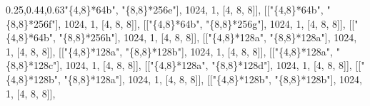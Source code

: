 \documentclass[
  10pt,
  letterpaper,
]{article}
\newenvironment{Shaded}{}{}
\newcommand{\FloatTok}[1]{\textcolor[rgb]{0.25,0.63,0.44}{#1}}
\newcommand{\NormalTok}[1]{#1}
\newcommand{\OperatorTok}[1]{\textcolor[rgb]{0.40,0.40,0.40}{#1}}
\newcommand{\StringTok}[1]{\textcolor[rgb]{0.25,0.44,0.63}{#1}}
\begin{document}
\begin{Shaded}
\begin{Highlighting}[]
\NormalTok{[[}\StringTok{"\{4,8\}*64b"}\OperatorTok{,} \StringTok{"\{8,8\}*256e"}\NormalTok{]}\OperatorTok{,} \FloatTok{1024}\OperatorTok{,} \FloatTok{1}\OperatorTok{,}\NormalTok{ [}\FloatTok{4}\OperatorTok{,} \FloatTok{8}\OperatorTok{,} \FloatTok{8}\NormalTok{]]}\OperatorTok{,}
\NormalTok{[[}\StringTok{"\{4,8\}*64b"}\OperatorTok{,} \StringTok{"\{8,8\}*256f"}\NormalTok{]}\OperatorTok{,} \FloatTok{1024}\OperatorTok{,} \FloatTok{1}\OperatorTok{,}\NormalTok{ [}\FloatTok{4}\OperatorTok{,} \FloatTok{8}\OperatorTok{,} \FloatTok{8}\NormalTok{]]}\OperatorTok{,}
\NormalTok{[[}\StringTok{"\{4,8\}*64b"}\OperatorTok{,} \StringTok{"\{8,8\}*256g"}\NormalTok{]}\OperatorTok{,} \FloatTok{1024}\OperatorTok{,} \FloatTok{1}\OperatorTok{,}\NormalTok{ [}\FloatTok{4}\OperatorTok{,} \FloatTok{8}\OperatorTok{,} \FloatTok{8}\NormalTok{]]}\OperatorTok{,}
\NormalTok{[[}\StringTok{"\{4,8\}*64b"}\OperatorTok{,} \StringTok{"\{8,8\}*256h"}\NormalTok{]}\OperatorTok{,} \FloatTok{1024}\OperatorTok{,} \FloatTok{1}\OperatorTok{,}\NormalTok{ [}\FloatTok{4}\OperatorTok{,} \FloatTok{8}\OperatorTok{,} \FloatTok{8}\NormalTok{]]}\OperatorTok{,}
\NormalTok{[[}\StringTok{"\{4,8\}*128a"}\OperatorTok{,} \StringTok{"\{8,8\}*128a"}\NormalTok{]}\OperatorTok{,} \FloatTok{1024}\OperatorTok{,} \FloatTok{1}\OperatorTok{,}\NormalTok{ [}\FloatTok{4}\OperatorTok{,} \FloatTok{8}\OperatorTok{,} \FloatTok{8}\NormalTok{]]}\OperatorTok{,}
\NormalTok{[[}\StringTok{"\{4,8\}*128a"}\OperatorTok{,} \StringTok{"\{8,8\}*128b"}\NormalTok{]}\OperatorTok{,} \FloatTok{1024}\OperatorTok{,} \FloatTok{1}\OperatorTok{,}\NormalTok{ [}\FloatTok{4}\OperatorTok{,} \FloatTok{8}\OperatorTok{,} \FloatTok{8}\NormalTok{]]}\OperatorTok{,}
\NormalTok{[[}\StringTok{"\{4,8\}*128a"}\OperatorTok{,} \StringTok{"\{8,8\}*128c"}\NormalTok{]}\OperatorTok{,} \FloatTok{1024}\OperatorTok{,} \FloatTok{1}\OperatorTok{,}\NormalTok{ [}\FloatTok{4}\OperatorTok{,} \FloatTok{8}\OperatorTok{,} \FloatTok{8}\NormalTok{]]}\OperatorTok{,}
\NormalTok{[[}\StringTok{"\{4,8\}*128a"}\OperatorTok{,} \StringTok{"\{8,8\}*128d"}\NormalTok{]}\OperatorTok{,} \FloatTok{1024}\OperatorTok{,} \FloatTok{1}\OperatorTok{,}\NormalTok{ [}\FloatTok{4}\OperatorTok{,} \FloatTok{8}\OperatorTok{,} \FloatTok{8}\NormalTok{]]}\OperatorTok{,}
\NormalTok{[[}\StringTok{"\{4,8\}*128b"}\OperatorTok{,} \StringTok{"\{8,8\}*128a"}\NormalTok{]}\OperatorTok{,} \FloatTok{1024}\OperatorTok{,} \FloatTok{1}\OperatorTok{,}\NormalTok{ [}\FloatTok{4}\OperatorTok{,} \FloatTok{8}\OperatorTok{,} \FloatTok{8}\NormalTok{]]}\OperatorTok{,}
\NormalTok{[[}\StringTok{"\{4,8\}*128b"}\OperatorTok{,} \StringTok{"\{8,8\}*128b"}\NormalTok{]}\OperatorTok{,} \FloatTok{1024}\OperatorTok{,} \FloatTok{1}\OperatorTok{,}\NormalTok{ [}\FloatTok{4}\OperatorTok{,} \FloatTok{8}\OperatorTok{,} \FloatTok{8}\NormalTok{]]}\OperatorTok{,}

\end{Highlighting}
\end{Shaded}
\end{document}
